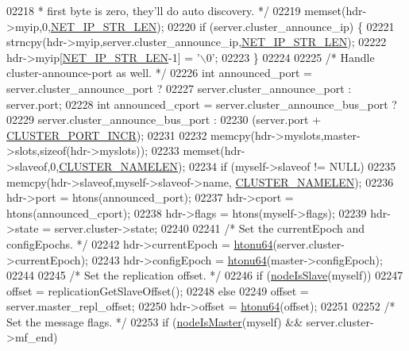 \begin{DoxyCode}
{{{{{{{{{{{{{{{{{{{{{{{{{{{{{{{{{{{{{{02218 \textcolor{comment}{     * first byte is zero, they'll do auto discovery. */}
02219     memset(hdr->myip,0,\hyperlink{server_8h_ad97c5405ed22a94e9fcc10fba577d6c0}{NET\_IP\_STR\_LEN});
02220     \textcolor{keywordflow}{if} (server.cluster\_announce\_ip) \{
02221         strncpy(hdr->myip,server.cluster\_announce\_ip,\hyperlink{server_8h_ad97c5405ed22a94e9fcc10fba577d6c0}{NET\_IP\_STR\_LEN});
02222         hdr->myip[\hyperlink{server_8h_ad97c5405ed22a94e9fcc10fba577d6c0}{NET\_IP\_STR\_LEN}-1] = \textcolor{stringliteral}{'\(\backslash\)0'};
02223     \}
02224 
02225     \textcolor{comment}{/* Handle cluster-announce-port as well. */}
02226     \textcolor{keywordtype}{int} announced\_port = server.cluster\_announce\_port ?
02227                          server.cluster\_announce\_port : server.port;
02228     \textcolor{keywordtype}{int} announced\_cport = server.cluster\_announce\_bus\_port ?
02229                           server.cluster\_announce\_bus\_port :
02230                           (server.port + \hyperlink{cluster_8h_ac619a9ae48ab1431daa590fb5e75cea8}{CLUSTER\_PORT\_INCR});
02231 
02232     memcpy(hdr->myslots,master->slots,\textcolor{keyword}{sizeof}(hdr->myslots));
02233     memset(hdr->slaveof,0,\hyperlink{cluster_8h_ace7a882972eff7149675252938643b6e}{CLUSTER\_NAMELEN});
02234     \textcolor{keywordflow}{if} (myself->slaveof != NULL)
02235         memcpy(hdr->slaveof,myself->slaveof->name, \hyperlink{cluster_8h_ace7a882972eff7149675252938643b6e}{CLUSTER\_NAMELEN});
02236     hdr->port = htons(announced\_port);
02237     hdr->cport = htons(announced\_cport);
02238     hdr->flags = htons(myself->flags);
02239     hdr->state = server.cluster->state;
02240 
02241     \textcolor{comment}{/* Set the currentEpoch and configEpochs. */}
02242     hdr->currentEpoch = \hyperlink{endianconv_8h_a41a6b64ba8dec362f605f615e528fcf3}{htonu64}(server.cluster->currentEpoch);
02243     hdr->configEpoch = \hyperlink{endianconv_8h_a41a6b64ba8dec362f605f615e528fcf3}{htonu64}(master->configEpoch);
02244 
02245     \textcolor{comment}{/* Set the replication offset. */}
02246     \textcolor{keywordflow}{if} (\hyperlink{cluster_8h_a3c99881f6892130c902b42b1f84a0e11}{nodeIsSlave}(myself))
02247         offset = replicationGetSlaveOffset();
02248     \textcolor{keywordflow}{else}
02249         offset = server.master\_repl\_offset;
02250     hdr->offset = \hyperlink{endianconv_8h_a41a6b64ba8dec362f605f615e528fcf3}{htonu64}(offset);
02251 
02252     \textcolor{comment}{/* Set the message flags. */}
02253     \textcolor{keywordflow}{if} (\hyperlink{cluster_8h_a2d8e84269474d8750565fb3fb67aa436}{nodeIsMaster}(myself) && server.cluster->mf\_end)
}}}}}}}}}}}}}}}}}}}}}}}}}}}}}}}}}}}}}}
\end{DoxyCode}
